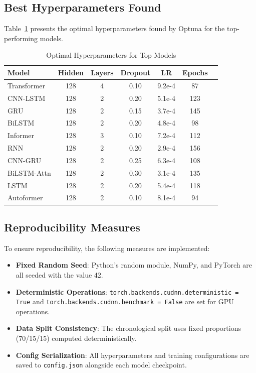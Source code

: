 \subsection{Best Hyperparameters Found}

Table~\ref{tab:best_hparams} presents the optimal hyperparameters found by Optuna for the top-performing models.

\begin{table}[H]
\centering
\caption{Optimal Hyperparameters for Top Models}
\label{tab:best_hparams}
\begin{tabular}{lcccccl}
\toprule
\textbf{Model} & \textbf{Hidden} & \textbf{Layers} & \textbf{Dropout} & \textbf{LR} & \textbf{Epochs} \\
\midrule
Transformer & 128 & 4 & 0.10 & 9.2e-4 & 87 \\
CNN-LSTM & 128 & 2 & 0.20 & 5.1e-4 & 123 \\
GRU & 128 & 2 & 0.15 & 3.7e-4 & 145 \\
BiLSTM & 128 & 2 & 0.20 & 4.8e-4 & 98 \\
Informer & 128 & 3 & 0.10 & 7.2e-4 & 112 \\
RNN & 128 & 2 & 0.20 & 2.9e-4 & 156 \\
CNN-GRU & 128 & 2 & 0.25 & 6.3e-4 & 108 \\
BiLSTM-Attn & 128 & 2 & 0.30 & 3.1e-4 & 135 \\
LSTM & 128 & 2 & 0.20 & 5.4e-4 & 118 \\
Autoformer & 128 & 2 & 0.10 & 8.1e-4 & 94 \\
\bottomrule
\end{tabular}
\end{table}

\subsection{Reproducibility Measures}

To ensure reproducibility, the following measures are implemented:

\begin{itemize}
    \item \textbf{Fixed Random Seed}: Python's random module, NumPy, and PyTorch are all seeded with the value 42.
    \item \textbf{Deterministic Operations}: \texttt{torch.backends.cudnn.deterministic = True} and \texttt{torch.backends.cudnn.benchmark = False} are set for GPU operations.
    \item \textbf{Data Split Consistency}: The chronological split uses fixed proportions (70/15/15) computed deterministically.
    \item \textbf{Config Serialization}: All hyperparameters and training configurations are saved to \texttt{config.json} alongside each model checkpoint.
\end{itemize}

